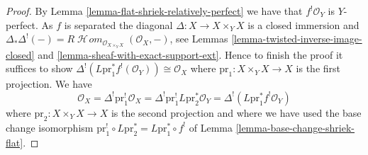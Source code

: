 \documentclass[10pt,a4paper]{amsart}
\theoremstyle{plain}
\theoremstyle{definition}
\theoremstyle{remark}
\numberwithin{equation}{subsection}
\def\SheafHom{\mathop{\mathcal{H}\!\mathit{om}}\nolimits}
\begin{document}
\begin{proof}
By Lemma \ref{lemma-flat-shriek-relatively-perfect}
we have that $f^!\mathcal{O}_Y$
is $Y$-perfect. As $f$ is separated the diagonal
$\Delta : X \to X \times_Y X$ is a closed immersion and
$\Delta_*\Delta^!(-) =
R\SheafHom_{\mathcal{O}_{X \times_Y X}}(\mathcal{O}_X, -)$, see
Lemmas
\ref{lemma-twisted-inverse-image-closed} and
\ref{lemma-sheaf-with-exact-support-ext}.
Hence to finish the proof it suffices to show
$\Delta^!(L\text{pr}_1^*f^!(\mathcal{O}_Y)) \cong \mathcal{O}_X$
where $\text{pr}_1 : X \times_Y X \to X$ is the first projection.
We have
$$
\mathcal{O}_X = \Delta^! \text{pr}_1^!\mathcal{O}_X =
\Delta^! \text{pr}_1^! L\text{pr}_2^*\mathcal{O}_Y =
\Delta^!(L\text{pr}_1^* f^!\mathcal{O}_Y)
$$
where $\text{pr}_2 : X \times_Y X \to X$ is the second projection
and where we have used the base change isomorphism
$\text{pr}_1^! \circ L\text{pr}_2^* = L\text{pr}_1^* \circ f^!$ of
Lemma \ref{lemma-base-change-shriek-flat}.
\end{proof}
\end{document}
